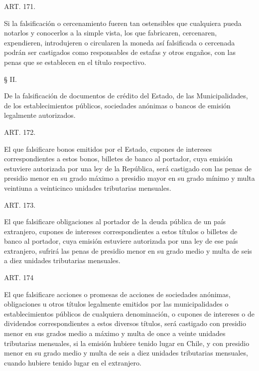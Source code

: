     ART. 171.

    Si la falsificación o cercenamiento fueren tan ostensibles que cualquiera pueda notarlos y conocerlos a la simple vista, los que fabricaren, cercenaren, expendieren, introdujeren o circularen la moneda así falsificada o cercenada podrán ser castigados como responsables de estafas y otros engaños, con las penas que se establecen en el título respectivo.

    § II.

De la falsificación de documentos de crédito del Estado, de las Municipalidades, de los establecimientos públicos, sociedades anónimas o bancos de emisión legalmente autorizados.





    ART. 172.

    El que falsificare bonos emitidos por el Estado, cupones de intereses correspondientes a estos bonos, billetes de banco al portador, cuya emisión estuviere autorizada por una ley de la República, será castigado con las penas de presidio menor en su grado máximo a presidio mayor en su grado mínimo y multa veintiuna a veinticinco unidades tributarias mensuales.









    ART. 173.

    El que falsificare obligaciones al portador de la deuda pública de un país extranjero, cupones de intereses correspondientes a estos títulos o billetes de banco al portador, cuya emisión estuviere autorizada por una ley de ese país extranjero, sufrirá las penas de presidio menor en su grado medio y multa de seis a diez unidades tributarias mensuales.








    ART. 174

    El que falsificare acciones o promesas de acciones de sociedades anónimas, obligaciones u otros títulos legalmente emitidos por las municipalidades o establecimientos públicos de cualquiera denominación, o cupones de intereses o de dividendos correspondientes a estos diversos títulos, será castigado con presidio menor en sus grados medio a máximo y multa de once a veinte unidades tributarias mensuales, si la emisión hubiere tenido lugar en Chile, y con presidio menor en su grado medio y multa de seis a diez unidades tributarias mensuales, cuando hubiere tenido lugar en el extranjero.




